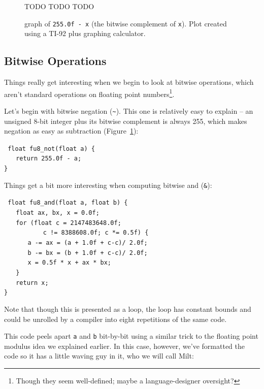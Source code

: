 \documentclass{acmsiggraph}
\theoremstyle{remark}
\theoremstyle{definition}
\begin{document}
\begin{figure}[tb!]
\begin{center}
\huge TODO TODO TODO
\end{center}
\caption{\label{fig-not-graph} graph of {\tt 255.0f - x} (the bitwise complement of {\tt x}).
{\small Plot created using a TI-92 plus graphing calculator.}}
\end{figure}


\subsection{Bitwise Operations}

Things really get interesting when we begin to look at bitwise operations, which aren't standard operations on floating point numbers\footnote{Though they seem well-defined; maybe a language-designer oversight?}.

Let's begin with bitwise negation ({\tt \textasciitilde}).
This one is relatively easy to explain -- an unsigned 8-bit integer plus its bitwise complement is always 255, which makes negation as easy as subtraction (Figure~\ref{fig-not-graph}):

{\tt
float fu8\_not(float a) \{ \\
$\phantom{XX}$return 255.0f - a; \\
\}
}

Things get a bit more interesting when computing bitwise and ({\tt \&}):

{\tt
float fu8\_and(float a, float b) \{ \\
$\phantom{XX}$float ax, bx, x = 0.0f; \\
$\phantom{XX}$for (float c = 2147483648.0f;\\
$\phantom{XXXXXX}$ c != 8388608.0f; c *= 0.5f) \{ \\
$\phantom{XXXX}$a -= ax = (a + 1.0f + c-c)/ 2.0f; \\
$\phantom{XXXX}$b -= bx = (b + 1.0f + c-c)/ 2.0f; \\
$\phantom{XXXX}$x = 0.5f * x + ax * bx; \\
$\phantom{XX}$\} \\
$\phantom{XX}$return x; \\
\}
}

Note that though this is presented as a loop, the loop has constant bounds and could be unrolled by a compiler into eight repetitions of the same code.

This code peels apart {\tt a} and {\tt b} bit-by-bit using a similar trick to the floating point modulus idea we explained earlier.
In this case, however, we've formatted the code so it has a little waving guy in it, who we will call Milt:
\end{document}
